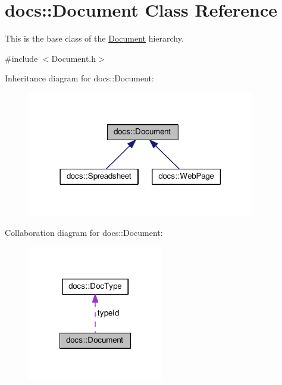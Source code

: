 \hypertarget{classdocs_1_1Document}{\section{docs\-:\-:Document Class Reference}
\label{classdocs_1_1Document}
}


This is the base class of the \hyperlink{classdocs_1_1Document}{Document} hierarchy.  




{\ttfamily \#include $<$Document.\-h$>$}



Inheritance diagram for docs\-:\-:Document\-:\nopagebreak
\begin{figure}[H]
\begin{center}
\leavevmode
\includegraphics[width=282pt]{classdocs_1_1Document__inherit__graph}
\end{center}
\end{figure}


Collaboration diagram for docs\-:\-:Document\-:
\nopagebreak
\begin{figure}[H]
\begin{center}
\leavevmode
\includegraphics[width=168pt]{classdocs_1_1Document__coll__graph}
\end{center}
\end{figure}

